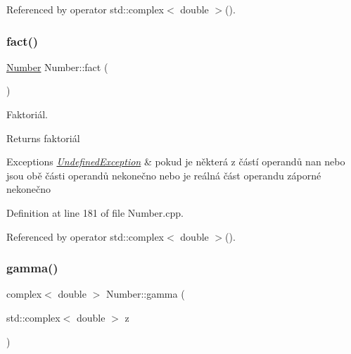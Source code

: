 Referenced by operator std\+::complex$<$ double $>$().

\mbox{\label{classteam22_1_1_math_1_1_number_a79482f9f91cefb9a617e463313f4269f}} 
\subsubsection{\texorpdfstring{fact()}{fact()}}
{\footnotesize\ttfamily \hyperlink{classteam22_1_1_math_1_1_number}{Number} Number\+::fact (\begin{DoxyParamCaption}{ }\end{DoxyParamCaption})}



Faktoriál. 

\begin{DoxyReturn}{Returns}
faktoriál 
\end{DoxyReturn}

\begin{DoxyExceptions}{Exceptions}
{\em \hyperlink{classteam22_1_1_math_1_1_undefined_exception}{Undefined\+Exception}} & pokud je některá z částí operandů nan nebo jsou obě části operandů nekonečno nebo je reálná část operandu záporné nekonečno \\
\hline
\end{DoxyExceptions}


Definition at line 181 of file Number.\+cpp.



Referenced by operator std\+::complex$<$ double $>$().

\mbox{\label{classteam22_1_1_math_1_1_number_a614bd9dccd61f74ca50b54ebf6626ff4}} 
\subsubsection{\texorpdfstring{gamma()}{gamma()}}
{\footnotesize\ttfamily complex$<$ double $>$ Number\+::gamma (\begin{DoxyParamCaption}\item[{std\+::complex$<$ double $>$}]{z }\end{DoxyParamCaption})\hspace{0.3cm}{\ttfamily [private]}}

